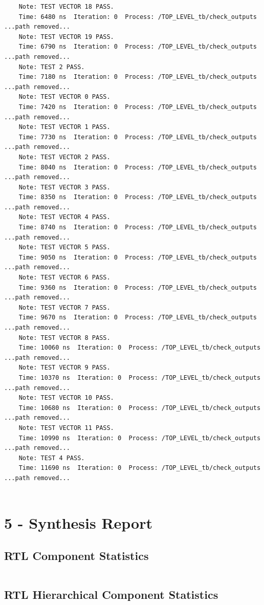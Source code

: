 \documentclass[11pt]{report}
\begin{document}
\begin{verbatim}
    Note: TEST VECTOR 18 PASS.
    Time: 6480 ns  Iteration: 0  Process: /TOP_LEVEL_tb/check_outputs  ...path removed...
    Note: TEST VECTOR 19 PASS.
    Time: 6790 ns  Iteration: 0  Process: /TOP_LEVEL_tb/check_outputs  ...path removed...
    Note: TEST 2 PASS.
    Time: 7180 ns  Iteration: 0  Process: /TOP_LEVEL_tb/check_outputs  ...path removed...
    Note: TEST VECTOR 0 PASS.
    Time: 7420 ns  Iteration: 0  Process: /TOP_LEVEL_tb/check_outputs  ...path removed...
    Note: TEST VECTOR 1 PASS.
    Time: 7730 ns  Iteration: 0  Process: /TOP_LEVEL_tb/check_outputs  ...path removed...
    Note: TEST VECTOR 2 PASS.
    Time: 8040 ns  Iteration: 0  Process: /TOP_LEVEL_tb/check_outputs  ...path removed...
    Note: TEST VECTOR 3 PASS.
    Time: 8350 ns  Iteration: 0  Process: /TOP_LEVEL_tb/check_outputs  ...path removed...
    Note: TEST VECTOR 4 PASS.
    Time: 8740 ns  Iteration: 0  Process: /TOP_LEVEL_tb/check_outputs  ...path removed...
    Note: TEST VECTOR 5 PASS.
    Time: 9050 ns  Iteration: 0  Process: /TOP_LEVEL_tb/check_outputs  ...path removed...
    Note: TEST VECTOR 6 PASS.
    Time: 9360 ns  Iteration: 0  Process: /TOP_LEVEL_tb/check_outputs  ...path removed...
    Note: TEST VECTOR 7 PASS.
    Time: 9670 ns  Iteration: 0  Process: /TOP_LEVEL_tb/check_outputs  ...path removed...
    Note: TEST VECTOR 8 PASS.
    Time: 10060 ns  Iteration: 0  Process: /TOP_LEVEL_tb/check_outputs  ...path removed...
    Note: TEST VECTOR 9 PASS.
    Time: 10370 ns  Iteration: 0  Process: /TOP_LEVEL_tb/check_outputs  ...path removed...
    Note: TEST VECTOR 10 PASS.
    Time: 10680 ns  Iteration: 0  Process: /TOP_LEVEL_tb/check_outputs  ...path removed...
    Note: TEST VECTOR 11 PASS.
    Time: 10990 ns  Iteration: 0  Process: /TOP_LEVEL_tb/check_outputs  ...path removed...
    Note: TEST 4 PASS.
    Time: 11690 ns  Iteration: 0  Process: /TOP_LEVEL_tb/check_outputs  ...path removed...
    
\end{verbatim}

\newpage
\section*{5 - Synthesis Report}
\subsection*{RTL Component Statistics}
\inputminted[firstline=128,lastline=151]{text}{../../../DE_Project_T1/DE_Project_T1.runs/synth_1/TOP_LEVEL.vds}
\newpage
\subsection*{RTL Hierarchical Component Statistics}
\inputminted[firstline=154,lastline=208]{text}{../../../DE_Project_T1/DE_Project_T1.runs/synth_1/TOP_LEVEL.vds}
\end{document}
